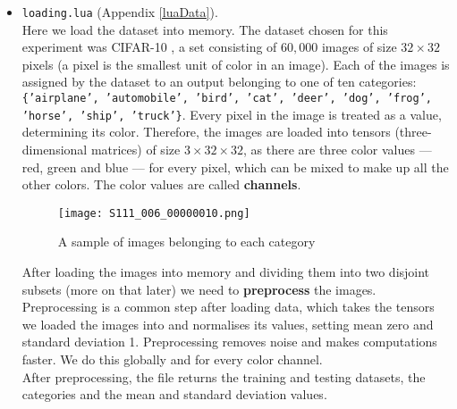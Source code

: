 \documentclass[titlepage]{article}
\theoremstyle{plain}
\theoremstyle{definition}
\begin{document}
		\begin{itemize}
			\item \texttt{loading.lua} (Appendix \ref{luaData}).\\
			Here we load the dataset into memory. The dataset chosen for this experiment was CIFAR-10 \cite{Krizhevsky}, a set consisting of $60,000$ images of size $32\times32$ pixels (a pixel is the smallest unit of color in an image). Each of the images is assigned by the dataset to an output belonging to one of ten categories: \texttt{\{'airplane', 'automobile', 'bird', 'cat', 'deer', 'dog', 'frog', 'horse', 'ship', 'truck'\}}. Every pixel in the image is treated as a value, determining its color. Therefore, the images are loaded into tensors (three-dimensional matrices) of size $3\times32\times32$, as there are three color values --- red, green and blue --- for every pixel, which can be mixed to make up all the other colors. The color values are called \textbf{channels}.
			 \begin{figure}[H]
			 	\centering
			 	\texttt{[image: S111\_006\_00000010.png]}
			 	\caption{A sample of images belonging to each category}
			 	\label{fig:S111anger}
			 \end{figure}
			After loading the images into memory and dividing them into two disjoint subsets (more on that later) we need to \textbf{preprocess} the images. Preprocessing is a common step after loading data, which takes the tensors we loaded the images into and normalises its values, setting mean zero and standard deviation 1. Preprocessing removes noise and makes computations faster. We do this globally and for every color channel.\\
			After preprocessing, the file returns the training and testing datasets, the categories and the mean and standard deviation values.
			

\end{itemize}
\end{document}
